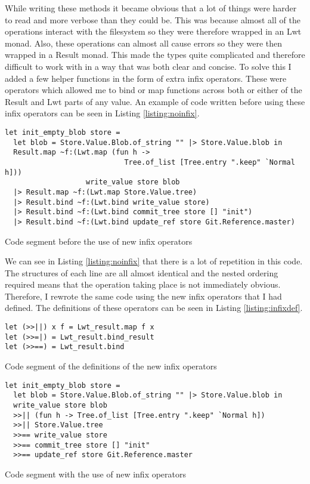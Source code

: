 While writing these methods it became obvious that a lot of things were harder to read and more verbose than they could be. This was because almost all of the operations interact with the filesystem so they were therefore wrapped in an Lwt monad. Also, these operations can almost all cause errors so they were then wrapped in a Result monad. This made the types quite complicated and therefore difficult to work with in a way that was both clear and concise. To solve this I added a few helper functions in the form of extra infix operators. These were operators which allowed me to bind or map functions across both or either of the Result and Lwt parts of any value. An example of code written before using these infix operators can be seen in Listing \ref{listing:noinfix}.

\begin{listing}[h]
\begin{verbatim}
let init_empty_blob store =
  let blob = Store.Value.Blob.of_string "" |> Store.Value.blob in
  Result.map ~f:(Lwt.map (fun h ->
                            Tree.of_list [Tree.entry ".keep" `Normal h]))
                   write_value store blob
  |> Result.map ~f:(Lwt.map Store.Value.tree)
  |> Result.bind ~f:(Lwt.bind write_value store)
  |> Result.bind ~f:(Lwt.bind commit_tree store [] "init")
  |> Result.bind ~f:(Lwt.bind update_ref store Git.Reference.master)
\end{verbatim}
\caption{Code segment before the use of new infix operators}
\label{listing:noinfix}
\end{listing}

We can see in Listing \ref{listing:noinfix} that there is a lot of repetition in this code. The structures of each line are all almost identical and the nested ordering required means that the operation taking place is not immediately obvious. Therefore, I rewrote the same code using the new infix operators that I had defined. The definitions of these operators can be seen in Listing \ref{listing:infixdef}.

\begin{listing}[h]
\begin{verbatim}
let (>>||) x f = Lwt_result.map f x
let (>>=|) = Lwt_result.bind_result
let (>>==) = Lwt_result.bind
\end{verbatim}
\caption{Code segment of the definitions of the new infix operators}
\label{listing:infixdef}
\end{listing}

\begin{listing}[h]
\begin{verbatim}
let init_empty_blob store =
  let blob = Store.Value.Blob.of_string "" |> Store.Value.blob in
  write_value store blob
  >>|| (fun h -> Tree.of_list [Tree.entry ".keep" `Normal h])
  >>|| Store.Value.tree
  >>== write_value store
  >>== commit_tree store [] "init"
  >>== update_ref store Git.Reference.master
\end{verbatim}
\caption{Code segment with the use of new infix operators}
\label{listing:infix}
\end{listing}

